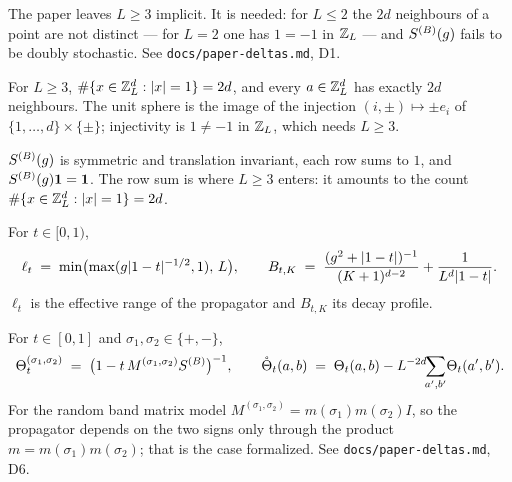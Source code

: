 \begin{remark}[Why $L\ge3$]\label{rem:L3}
  The paper leaves $L\ge3$ implicit.  It is needed: for $L\le2$ the $2d$ neighbours of a
  point are not distinct --- for $L=2$ one has $1=-1$ in $\mathbb{Z}_L$ --- and $S^{(B)}(g)$
  fails to be doubly stochastic.  See \texttt{docs/paper-deltas.md}, D1.
\end{remark}

\begin{lemma}\label{lem:card-nbhd}
  \leanok
  For $L\ge3$, $\#\{x\in\mathbb{Z}_L^d : |x|=1\}=2d$, and every $a\in\mathbb{Z}_L^d$ has exactly $2d$
  neighbours.  The unit sphere is the image of the injection $(i,\pm)\mapsto\pm e_i$ of
  $\{1,\dots,d\}\times\{\pm\}$; injectivity is $1\ne-1$ in $\mathbb{Z}_L$, which needs $L\ge3$.
\end{lemma}

\begin{lemma}\label{lem:SB-basic}
  \leanok
  $S^{(B)}(g)$ is symmetric and translation invariant, each row sums to $1$, and
  $S^{(B)}(g)\mathbf 1=\mathbf 1$.  The row sum is where $L\ge3$ enters: it amounts to
  the count $\#\{x\in\mathbb{Z}_L^d : |x|=1\}=2d$.
\end{lemma}

\begin{definition}\label{def:params}
  \leanok
  For $t\in[0,1)$,
  \[ \ell_t \;=\; \min\bigl(\max(g|1-t|^{-1/2},1),\,L\bigr),\qquad
     B_{t,K} \;=\; \frac{(g^2+|1-t|)^{-1}}{(K+1)^{d-2}} + \frac{1}{L^d|1-t|}. \]
  $\ell_t$ is the effective range of the propagator and $B_{t,K}$ its decay profile.
\end{definition}

\begin{definition}\label{def:Theta}
  \leanok
  For $t\in[0,1]$ and $\sigma_1,\sigma_2\in\{+,-\}$,
  \[ \Theta_t^{(\sigma_1,\sigma_2)} \;=\; \bigl(1 - t\,M^{(\sigma_1,\sigma_2)}S^{(B)}\bigr)^{-1},
     \qquad
     \mathring{\Theta}_t(a,b) \;=\; \Theta_t(a,b) - L^{-2d}\!\!\sum_{a',b'}\!\Theta_t(a',b'). \]
  For the random band matrix model $M^{(\sigma_1,\sigma_2)}=m(\sigma_1)m(\sigma_2)I$, so
  the propagator depends on the two signs only through the product
  $m=m(\sigma_1)m(\sigma_2)$; that is the case formalized.  See
  \texttt{docs/paper-deltas.md}, D6.
\end{definition}

